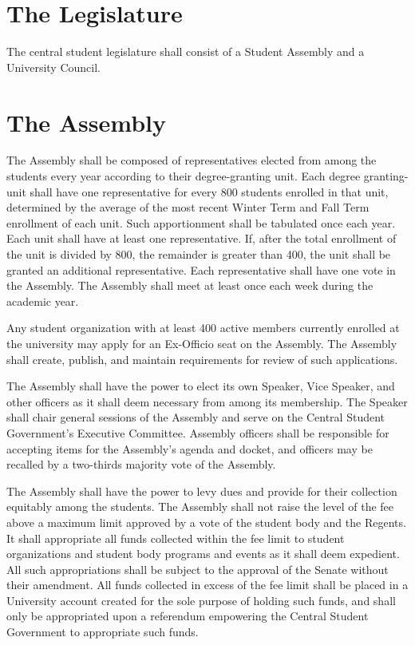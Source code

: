 \section{The Legislature}
    The central student legislature shall consist of a Student Assembly and a University Council.

\section{The Assembly}
    The Assembly shall be composed of representatives elected from among the students every year according to their degree-granting unit. Each degree granting-unit shall have one representative for every 800 students enrolled in that unit, determined by the average of the most recent Winter Term and Fall Term enrollment of each unit. Such apportionment shall be tabulated once each year. Each unit shall have at least one representative. If, after the total enrollment of the unit is divided by 800, the remainder is greater than 400, the unit shall be granted an additional representative. Each representative shall have one vote in the Assembly. The Assembly shall meet at least once each week during the academic year.

    Any student organization with at least 400 active members currently enrolled at the university may apply for an Ex-Officio seat on the Assembly. The Assembly shall create, publish, and maintain requirements for review of such applications.

    The Assembly shall have the power to elect its own Speaker, Vice Speaker, and other officers as it shall deem necessary from among its membership. The Speaker shall chair general sessions of the Assembly and serve on the Central Student Government's Executive Committee. Assembly officers shall be responsible for accepting items for the Assembly's agenda and docket, and officers may be recalled by a two-thirds majority vote of the Assembly.

     The Assembly shall have the power to levy dues and provide for their collection equitably among the students. The Assembly shall not raise the level of the fee above a maximum limit approved by a vote of the student body and the Regents. It shall appropriate all funds collected within the fee limit to student organizations and student body programs and events as it shall deem expedient. All such appropriations shall be subject to the approval of the Senate without their amendment. All funds collected in excess of the fee limit shall be placed in a University account created for the sole purpose of holding such funds, and shall only be appropriated upon a referendum empowering the Central Student Government to appropriate such funds.

